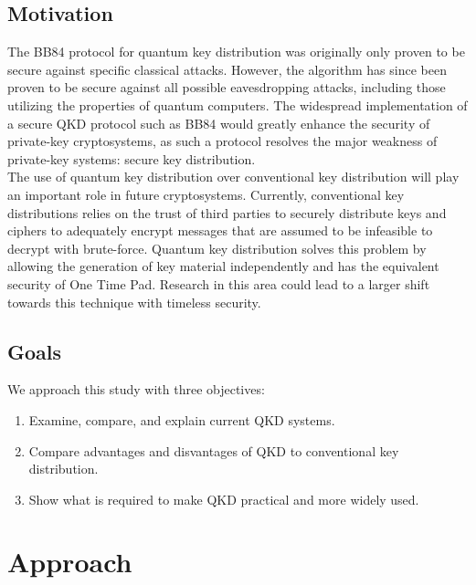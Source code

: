 \documentclass[conference]{IEEEtran}
\begin{document}
\subsection{Motivation}
The BB84 protocol for quantum key distribution was originally only proven to be secure against specific classical attacks. However, the algorithm has since been proven to be secure against all possible eavesdropping attacks, including those utilizing the properties of quantum computers\cite{Shor}. The widespread implementation of a secure QKD protocol such as BB84 would greatly enhance the security of private-key cryptosystems, as such a protocol resolves the major weakness of private-key systems: secure key distribution.\\

The use of quantum key distribution over conventional key distribution will play an important role in future cryptosystems. Currently, conventional key distributions relies on the trust of third parties to securely distribute keys and ciphers to adequately encrypt messages that are assumed to be infeasible to decrypt with brute-force. Quantum key distribution solves this problem by allowing the generation of key material independently and has the equivalent security of One Time Pad. Research in this area could lead to a larger shift towards this technique with timeless security.\\


\subsection{Goals}
We approach this study with three objectives:
\begin{enumerate}
\setcounter{enumi}{0}
\item Examine, compare, and explain current QKD systems.
\item Compare advantages and disvantages of QKD to conventional key distribution.
\item Show what is required to make QKD practical and more widely used.\\
\end{enumerate}

\section{Approach}
\end{document}
